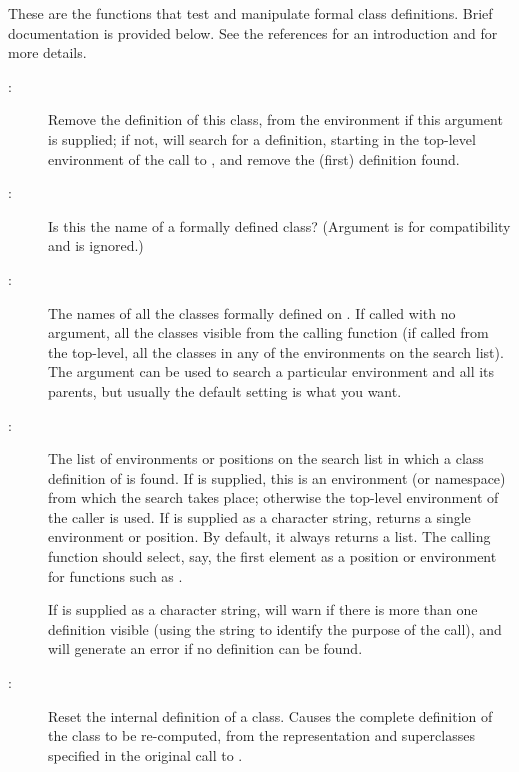 \begin{Details}\relax
These are the functions that test and manipulate formal class
definitions.  Brief documentation is provided below.  See the
references for an introduction and for more details.

\begin{description}

\item[:] 
Remove the definition of this class, from the environment
 if this argument is supplied; if not,
 will search for a definition, starting in the
top-level environment of the call to , and
remove the (first) definition found.

\item[:] 
Is this the name of a formally defined class? (Argument
 is for compatibility and is ignored.)

\item[:] 
The names of all the classes formally defined on .  If
called with no argument, all the classes visible from the
calling function (if called from the top-level, all the classes
in any of the environments on the search list).  The
 argument can be used to search a particular
environment and all its parents, but usually the default setting
is what you want.

\item[:] 
The list of environments or positions on the search list in
which a class definition of  is found.  If
 is supplied, this is an environment (or namespace)
from which the search takes place; otherwise the top-level
environment of the caller is used.  If  is supplied
as a character string,  returns a single
environment or position.  By default, it always returns a list.
The calling function should select, say, the first element as a
position or environment for functions such as .

If  is supplied as a character string,
 will warn if there is more than one definition
visible (using the string to identify the purpose of the call),
and will generate an error if no definition can be found.

\item[:] 
Reset the internal definition of a class.  Causes the complete
definition of the class to be re-computed, from the
representation and superclasses specified in the original
call to .


\end{description}
\end{Details}
